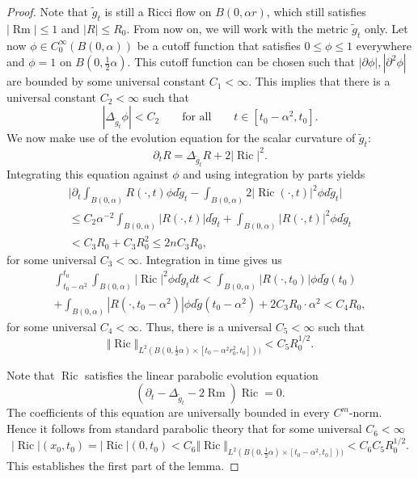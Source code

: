 \documentclass[11pt]{amsart}
\numberwithin{equation}{section}
\DeclareMathOperator{\Ric}{Ric}
\DeclareMathOperator{\Rm}{Rm}
\numberwithin{equation}{section}
\begin{document}
\begin{proof}
Note that $\widetilde{g}_t$ is still a Ricci flow on $B(0, \alpha r)$, which still satisfies $|{\Rm}| \leq 1$ and $|R| \leq R_0$.
From now on, we will work with the metric $\widetilde{g}_t$ only.
Let now $\phi \in C_0^\infty (B(0, \alpha))$ be a cutoff function that satisfies $0 \leq \phi \leq 1$ everywhere and $\phi = 1$ on $B(0, \tfrac12 \alpha)$.
This cutoff function can be chosen such that $|\partial \phi|, |\partial^2 \phi|$ are bounded by some universal constant $C_1 < \infty$.
This implies that there is a universal constant $C_2 < \infty$ such that
\[ |{\Delta_{\widetilde{g}_t} \phi}| < C_2 \qquad \text{for all} \qquad t \in [t_0 - \alpha^2, t_0]. \]
We now make use of the evolution equation for the scalar curvature of $\widetilde{g}_t$:
\[ \partial_t R =  \Delta_{\widetilde{g}_t} R + 2 |{\Ric}|^2. \]
Integrating this equation against $\phi$ and using integration by parts yields
\begin{multline*}
 \bigg| \partial_t \int_{B(0, \alpha )} R(\cdot, t) \phi  d\widetilde{g}_t - \int_{B(0, \alpha )} 2 |{\Ric}(\cdot, t)|^2 \phi d\widetilde{g}_t \bigg| \\
 \leq C_2 \alpha^{-2}  \int_{B(0,\alpha )} |R(\cdot, t)|  d\widetilde{g}_t + \int_{B(0,\alpha )} |R(\cdot, t)|^2 \phi  d\widetilde{g}_t \\
  < C_3 R_0 + C_3 R_0^2 \leq 2 n C_3 R_0,
\end{multline*}
for some universal $C_3 < \infty$.
Integration in time gives us
\begin{multline*}
\int_{t_0 - \alpha^2}^{t_0} \int_{B(0, \alpha)} |{\Ric}|^2 \phi  d\widetilde{g}_t  dt 
< \int_{B(0, \alpha )} |R(\cdot, t_0)| \phi  d\widetilde{g}(t_0) \\
+ \int_{B(0, \alpha )} |R(\cdot, t_0 - \alpha^2 ) |\phi  d\widetilde{g}(t_0 - \alpha^2 ) + 2 C_3 R_0 \cdot \alpha^2
< C_4 R_0,
\end{multline*}
for some universal $C_4 < \infty$.
Thus, there is a universal $C_5 < \infty$ such that
\[ \Vert {\Ric} \Vert_{L^2 (B(0, \frac12 \alpha ) \times [t_0 - \alpha^2 r_0^2, t_0]))} < C_5 R_0^{1/2}. \]

Note that $\Ric$ satisfies the linear parabolic evolution equation
\begin{equation} \label{eq:Ricevolution}
 (\partial_t - \Delta_{\widetilde{g}_t} - 2 \Rm ) \Ric = 0.
\end{equation}
The coefficients of this equation are universally bounded in every $C^m$-norm.
Hence it follows from standard parabolic theory that for some universal $C_6 < \infty$
\[ |{\Ric}| (x_0, t_0) = |{\Ric}| (0,t_0)  < C_6 
\Vert {\Ric} \Vert_{L^2 (B(0, \frac12 \alpha ) \times [t_0 - \alpha^2, t_0]))} < C_6 C_5 R_0^{1/2}. \]
This establishes the first part of the lemma.


\end{proof}
\end{document}
